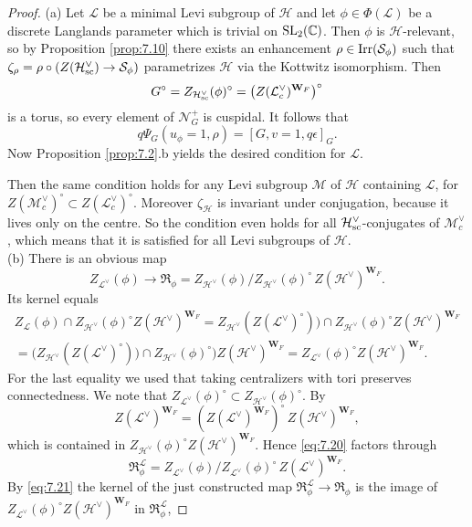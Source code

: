 \documentclass[11pt]{amsart}
\theoremstyle{definition}
\newcommand{\mb}{\mathbf}
\newcommand{\C}{\mathbb C}
\def\Irr{{\rm Irr}}
\def\SL{{\rm SL}}
\def\cS{{\mathcal S}}
\def\cN{{\mathcal N}}
\def\cL{{\mathcal L}}
\def\cH{{\mathcal H}}
\def\cR{{\mathfrak R}}
\def\sc{{\rm sc}}
\begin{document}
\begin{proof}
(a) Let $\cL$ be a minimal Levi subgroup of $\cH$ and let $\phi \in \Phi (\cL)$ be
a discrete Langlands parameter which is trivial on $\SL_2 (\C)$. Then $\phi$ is 
$\cH$-relevant, so by Proposition \ref{prop:7.10} there exists an enhancement 
$\rho \in \Irr (\cS_\phi)$ such that $\zeta_\rho = \rho \circ (Z(\cH^\vee_\sc) \to 
\cS_\phi)$ parametrizes $\cH$ via the Kottwitz isomorphism. Then 
\[
G^\circ = Z_{\cH^\vee_\sc}(\phi)^\circ = \big( Z(\cL^\vee_c)^{\mb W_F} \big)^\circ
\]
is a torus, so every element of $\cN_G^+$ is cuspidal. It follows that 
\[
q \Psi_G (u_\phi = 1,\rho) = [G,v = 1,q \epsilon]_G .
\] 
Now Proposition \ref{prop:7.2}.b yields the desired condition for $\cL$.

Then the same condition holds for any Levi subgroup $\mathcal{M}$ of $\cH$ containing
$\cL$, for $Z(\mathcal{M}^\vee_c)^\circ \subset Z(\cL^\vee_c)^\circ$. Moreover 
$\zeta_\cH$ is invariant under conjugation, because it lives only on the centre. 
So the condition even holds for all $\cH^\vee_\sc$-conjugates of $\mathcal{M}^\vee_c$, 
which means that it is satisfied for all Levi subgroups of $\cH$.\\
(b) There is an obvious map
\begin{equation}\label{eq:7.20}
Z_{\cL^\vee}(\phi) \to \cR_\phi = 
Z_{\cH^\vee}(\phi) \big/ Z_{\cH^\vee}(\phi)^\circ \, Z(\cH^\vee)^{\mb W_F}.
\end{equation}
Its kernel equals
\begin{multline}\label{eq:7.21}
Z_{\cL}(\phi) \cap Z_{\cH^\vee}(\phi)^\circ Z(\cH^\vee)^{\mb W_F} =
Z_{\cH^\vee}(Z(\cL^\vee)^\circ)) \cap Z_{\cH^\vee}(\phi)^\circ Z(\cH^\vee)^{\mb W_F} \\
= \big( Z_{\cH^\vee}(Z(\cL^\vee)^\circ)) \cap Z_{\cH^\vee}(\phi)^\circ \big) 
Z(\cH^\vee)^{\mb W_F} 
= Z_{\cL^\vee}(\phi)^\circ Z(\cH^\vee)^{\mb W_F} .
\end{multline}
For the last equality we used that taking centralizers with tori preserves connectedness.
We note that $Z_{\cL^\vee}(\phi)^\circ \subset Z_{\cH^\vee}(\phi)^\circ$.
By \cite[Lemma 1.1]{Art1}
\[
Z(\cL^\vee)^{\mb W_F} = (Z(\cL^\vee)^{\mb W_F})^\circ \, Z(\cH^\vee)^{\mb W_F} ,
\]
which is contained in $Z_{\cH^\vee}(\phi)^\circ Z(\cH^\vee)^{\mb W_F}$. Hence
\eqref{eq:7.20} factors through 
\[
\cR_\phi^\cL = Z_{\cL^\vee}(\phi) \big/ Z_{\cL^\vee}(\phi)^\circ \, Z(\cL^\vee)^{\mb W_F}.
\]
By \eqref{eq:7.21} the kernel of the just constructed map $\cR_\phi^\cL \to \cR_\phi$
is the image of \\ $Z_{\cL^\vee}(\phi)^\circ Z(\cH^\vee)^{\mb W_F}$ in $\cR_\phi^\cL$,

\end{proof}
\end{document}
